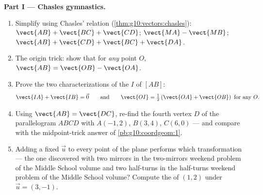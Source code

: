 \begin{problem}
\medskip
\noindent\textbf{Part I --- Chasles gymnastics.}
\begin{enumerate}
  \item Simplify using Chasles' relation
        (\cref{thm:g10:vectors:chasles}):
        $\vect{AB} + \vect{BC} + \vect{CD}$; \quad
        $\vect{MA} - \vect{MB}$; \quad
        $\vect{AB} + \vect{CD} + \vect{BC} + \vect{DA}$.
  \item The origin trick: show that for \emph{any} point $O$,
        $\vect{AB} = \vect{OB} - \vect{OA}$.
  \item Prove the two characterizations of the  $I$ of
        $[AB]$:
        \[
        \vect{IA} + \vect{IB} = \vec 0
        \qquad\text{and}\qquad
        \vect{OI} = \tfrac12\left(\vect{OA} + \vect{OB}\right)
        \ \text{for any } O .
        \]
  \item Using $\vect{AB} = \vect{DC}$, re-find the fourth vertex
        $D$ of the parallelogram $ABCD$ with $A(-1, 2)$,
        $B(3, 4)$, $C(6, 0)$ --- and compare with the
        midpoint-trick answer of \cref{pb:g10:coordgeom:1}.
  \item Adding a fixed  $\vec u$ to every point of the
        plane performs which transformation --- the one
        discovered with two mirrors in the two-mirrors weekend problem of the Middle School volume
        and two half-turns in the half-turns weekend problem of the Middle School volume? Compute
        the  of $(1, 2)$ under $\vec u = (3, -1)$.
\end{enumerate}


\end{problem}
